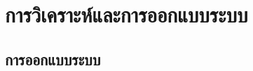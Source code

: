 \baselineskip=8mm
\chapter{การวิเคราะห์และการออกแบบระบบ}

\renewcommand{\thesubsection}{\arabic{subsection}.}
\renewcommand{\theequation}{\thesection.\arabic{equation}}
\renewcommand{\thesection}{}


\section{การออกแบบระบบ}







